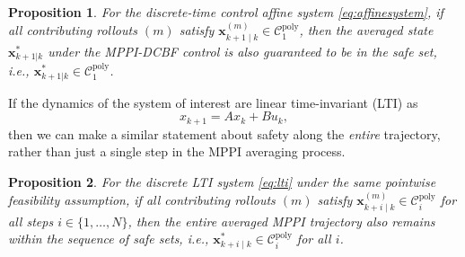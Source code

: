 \documentclass[letterpaper, 10 pt, conference]{ieeeconf}
\newtheorem{proposition}{Proposition}
\begin{document}
\begin{proposition} \label{prop: 1}
    For the discrete-time control affine system \eqref{eq:affinesystem}, if all contributing rollouts $(m)$ satisfy $\mathbf{x}^{(m)}_{k+1\mid k} \in \mathcal{C}_1^{\mathrm{poly}}$, then the averaged state $\mathbf{x}^*_{k+1|k}$ under the MPPI-DCBF control is also guaranteed to be in the safe set, \textit{i.e.,} $\mathbf{x}^*_{k+1|k} \in \mathcal{C}_1^{\mathrm{poly}}$.
    
\end{proposition}
\vspace{1mm}

If the dynamics of the system of interest are linear time-invariant (LTI) as
\begin{equation}
    x_{k+1}=Ax_k + Bu_k,\label{eq:lti}
\end{equation}
then we can make a similar statement about safety along the \textit{entire} trajectory, rather than just a single step in the MPPI averaging process.

\begin{proposition} \label{prop:2}
For the discrete LTI system \eqref{eq:lti} under the same pointwise feasibility assumption, if all contributing rollouts $(m)$ satisfy $\mathbf{x}^{(m)}_{k+i\mid k} \in \mathcal{C}_i^{\mathrm{poly}}$ for all steps $i \in \{1, \dots, N\}$, then the entire averaged MPPI trajectory also remains within the sequence of safe sets, \textit{i.e.,} $\mathbf{x}^*_{k+i\mid k} \in \mathcal{C}_i^{\mathrm{poly}}$ for all $i$.
\end{proposition}
\end{document}
